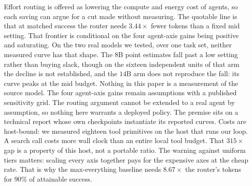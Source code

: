 \documentclass[10pt]{article} %
\begin{document}
Effort routing is offered as lowering the compute and energy cost of agents, so each saving can argue for a cut made without measuring. The quotable line is that at matched success the router needs $3.44\times$ fewer tokens than a fixed mid setting. That frontier is conditional on the four agent-axis gains being positive and saturating. On the two real models we tested, over one task set, neither measured curve has that shape. The $8$B point estimates fall past a low setting rather than buying slack, though on the sixteen independent units of that arm the decline is not established, and the $14$B arm does not reproduce the fall: its curve peaks at the mid budget. Nothing in this paper is a measurement of the source model. The four agent-axis gains remain assumptions with a published sensitivity grid. The routing argument cannot be extended to a real agent by assumption, so nothing here warrants a deployed policy. The premise sits on a technical report whose own checkpoints instantiate its reported curves. Costs are host-bound: we measured eighteen tool primitives on the host that runs our loop. A search call costs more wall clock than an entire local tool budget. That $315\times$ gap is a property of this host, not a portable ratio. The warning against uniform tiers matters: scaling every axis together pays for the expensive axes at the cheap rate. That is why the max-everything baseline needs $8.67\times$ the router's tokens for $90\%$ of attainable success.




\end{document}
